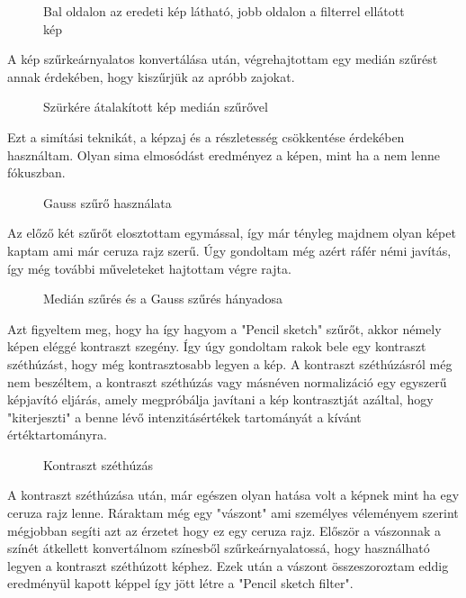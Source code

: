 \begin{figure}[ht]
\centering
{}
\caption{Bal oldalon az eredeti kép látható, jobb oldalon a filterrel ellátott kép } 
\label{fig: pencil1}
\end{figure}
A kép szűrkeárnyalatos konvertálása után, végrehajtottam egy medián szűrést annak érdekében, hogy kiszűrjük az apróbb zajokat.
\begin{figure}[ht]
\centering
{}
\caption{Szürkére átalakított kép medián szűrővel  } 
\label{fig: pencil2}
\end{figure}
Ezt a simítási teknikát, a képzaj  és a részletesség csökkentése érdekében használtam. Olyan sima elmosódást eredményez a képen, mint ha a nem lenne fókuszban.
\begin{figure}[ht]
\centering
{}
\caption{Gauss szűrő használata } 
\label{fig: pencil3}
\end{figure}
Az előző két szűrőt elosztottam egymással, így már tényleg majdnem olyan képet kaptam ami már ceruza rajz szerű. Úgy gondoltam még azért ráfér némi javítás, így még további műveleteket hajtottam végre rajta.
\begin{figure}[ht] 
\centering
{}
\caption{Medián szűrés és a Gauss szűrés hányadosa } 
\label{fig: pencil4}
\end{figure}
Azt figyeltem meg, hogy ha így hagyom a "Pencil sketch" szűrőt, akkor némely képen eléggé kontraszt szegény. Így úgy gondoltam rakok bele egy kontraszt széthúzást, hogy még kontrasztosabb legyen a kép. A  kontraszt széthúzásról még nem beszéltem, a kontraszt széthúzás vagy másnéven normalizáció egy egyszerű képjavító eljárás, amely megpróbálja javítani a kép kontrasztját azáltal, hogy "kiterjeszti" a benne lévő intenzitásértékek tartományát a kívánt értéktartományra. 
\begin{figure}[ht]
\centering
{}
\caption{Kontraszt széthúzás } 
\label{fig: pencil5}
\end{figure}
A kontraszt széthúzása után, már egészen olyan hatása volt a képnek mint ha egy ceruza rajz lenne. Ráraktam még egy "vászont" ami személyes véleményem szerint mégjobban segíti azt az érzetet hogy ez egy ceruza rajz. Először a vászonnak a színét átkellett konvertálnom színesből szűrkeárnyalatossá, hogy használható legyen a kontraszt széthúzott képhez. Ezek után a vászont összeszoroztam eddig eredményül kapott képpel így jött létre a "Pencil sketch filter".
